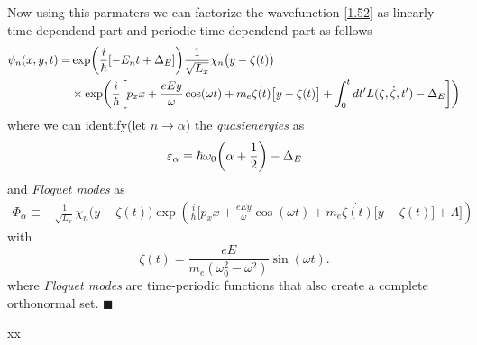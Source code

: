 \noindent
Now using this parmaters we can factorize the wavefunction \eqref{1.52} as linearly time dependend part and periodic time dependend part as follows
\begin{equation} \label{3.13}
  \begin{aligned}
    \psi_n(x,y,t)  = &
    \exp(\frac{i}{\hbar}\qty[-E_nt + \Delta_E])
    \frac{1}{\sqrt{L_x}} \chi_n\big(y - \zeta(t)\big)
    \\
    & \times
    \exp(
     \frac{i}{\hbar}\bigg[
     p_x x +
     \frac{eEy}{\omega}\cos(\omega t)+
     m_e\dot{\zeta(t)}\big[y-\zeta(t)\big]
     + \int_0^{t}dt'L(\zeta,\dot{\zeta},t') - \Delta_E \bigg])
  \end{aligned}
\end{equation}
where we can identify(let $n \rightarrow \alpha$) the \textit{quasienergies} as
\begin{equation} \label{3.14}
  \varepsilon_{\alpha} \equiv
  \hbar \omega_0\qty(\alpha + \frac{1}{2}) - \Delta_E
\end{equation}
and \textit{Floquet modes} as
\begin{equation} \label{3.15}
  \begin{aligned}
    \Phi_{\alpha} \equiv &
    \frac{1}{\sqrt{L_x}} \chi_n\big(y - \zeta(t)\big)
    \exp(
     \frac{i}{\hbar}\bigg[
     p_x x +
     \frac{eEy}{\omega}\cos(\omega t)+
     m_e\dot{\zeta(t)}\big[y-\zeta(t)\big]
     + \Lambda \bigg])
  \end{aligned}
\end{equation}
with
\begin{equation} \label{3.16}
  \zeta(t) = \frac{eE}{m_e(\omega_0^2 - \omega^2)}\sin(\omega t).
\end{equation}
where  \textit{Floquet modes} are time-periodic functions that also create a complete orthonormal set.
\hfill$\blacksquare$

















xx
